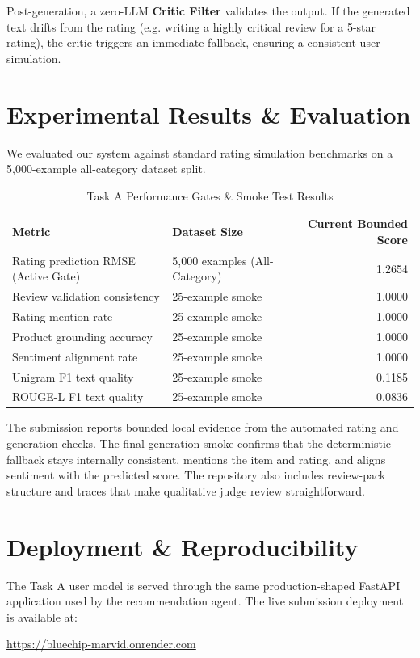 \documentclass[11pt,a4paper]{article}
\begin{document}
Post-generation, a zero-LLM \textbf{Critic Filter} validates the output. If the generated text drifts from the rating (e.g. writing a highly critical review for a 5-star rating), the critic triggers an immediate fallback, ensuring a consistent user simulation.

\section{Experimental Results \& Evaluation}
We evaluated our system against standard rating simulation benchmarks on a 5,000-example all-category dataset split. 

\begin{table}[h]
\centering
\caption{Task A Performance Gates & Smoke Test Results}
\begin{tabular}{llr}
\toprule
\textbf{Metric} & \textbf{Dataset Size} & \textbf{Current Bounded Score} \\
\midrule
Rating prediction RMSE (Active Gate) & 5,000 examples (All-Category) & 1.2654 \\
Review validation consistency & 25-example smoke & 1.0000 \\
Rating mention rate & 25-example smoke & 1.0000 \\
Product grounding accuracy & 25-example smoke & 1.0000 \\
Sentiment alignment rate & 25-example smoke & 1.0000 \\
Unigram F1 text quality & 25-example smoke & 0.1185 \\
ROUGE-L F1 text quality & 25-example smoke & 0.0836 \\
\bottomrule
\end{tabular}
\end{table}

The submission reports bounded local evidence from the automated rating and generation checks. The final generation smoke confirms that the deterministic fallback stays internally consistent, mentions the item and rating, and aligns sentiment with the predicted score. The repository also includes review-pack structure and traces that make qualitative judge review straightforward.

\section{Deployment \& Reproducibility}
The Task A user model is served through the same production-shaped FastAPI application used by the recommendation agent. The live submission deployment is available at:
\begin{center}
\href{https://bluechip-marvid.onrender.com}{https://bluechip-marvid.onrender.com}
\end{center}
\end{document}
